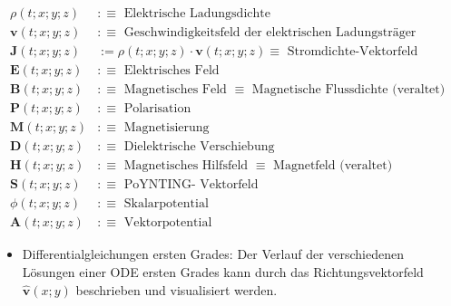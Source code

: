 \documentclass[10pt]{article}
\begin{document}
\begin{align*}
\rho(t ; x ; y ; z) & : \equiv \text { Elektrische Ladungsdichte }  \tag{2.22}\\
\mathbf{v}(t ; x ; y ; z) & : \equiv \text { Geschwindigkeitsfeld der elektrischen Ladungsträger }  \tag{2.23}\\
\mathbf{J}(t ; x ; y ; z) & :=\rho(t ; x ; y ; z) \cdot \mathbf{v}(t ; x ; y ; z) \equiv \text { Stromdichte-Vektorfeld }  \tag{2.24}\\
\mathbf{E}(t ; x ; y ; z) & : \equiv \text { Elektrisches Feld }  \tag{2.25}\\
\mathbf{B}(t ; x ; y ; z) & : \equiv \text { Magnetisches Feld } \equiv \text { Magnetische Flussdichte (veraltet) }  \tag{2.26}\\
\mathbf{P}(t ; x ; y ; z) & : \equiv \text { Polarisation }  \tag{2.27}\\
\mathbf{M}(t ; x ; y ; z) & : \equiv \text { Magnetisierung }  \tag{2.28}\\
\mathbf{D}(t ; x ; y ; z) & : \equiv \text { Dielektrische Verschiebung }  \tag{2.29}\\
\mathbf{H}(t ; x ; y ; z) & : \equiv \text { Magnetisches Hilfsfeld } \equiv \text { Magnetfeld (veraltet) }  \tag{2.30}\\
\mathbf{S}(t ; x ; y ; z) & : \equiv \text { PoYNTING- Vektorfeld }  \tag{2.31}\\
\phi(t ; x ; y ; z) & : \equiv \text { Skalarpotential }  \tag{2.32}\\
\mathbf{A}(t ; x ; y ; z) & : \equiv \text { Vektorpotential } \tag{2.33}
\end{align*}


\begin{itemize}
  \item Differentialgleichungen ersten Grades: Der Verlauf der verschiedenen Lösungen einer ODE ersten Grades kann durch das Richtungsvektorfeld $\hat{\mathbf{v}}(x ; y)$ beschrieben und visualisiert werden.
\end{itemize}
\end{document}
